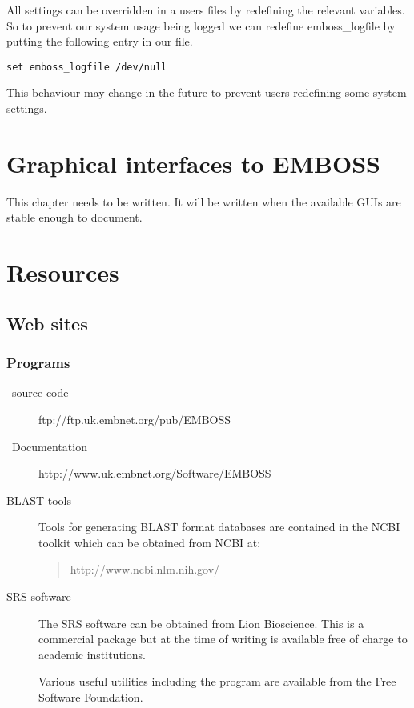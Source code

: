 \documentclass{report}
\begin{document}
All settings can be overridden in a users  files
by redefining the relevant variables. So to prevent our system usage
being logged we can redefine emboss\_logfile by putting the following
entry in our  file.

\begin{verbatim}
set emboss_logfile /dev/null
\end{verbatim}

This behaviour may change in the future to prevent users redefining
some system settings.

\chapter{Graphical interfaces to EMBOSS}

This chapter needs to be written. It will be written when the
available GUIs are stable enough to document.

\chapter{Resources}
\section{Web sites}
\subsection{Programs}
\begin{description}
\item[\EMBOSS\ source code]ftp://ftp.uk.embnet.org/pub/EMBOSS
\item[\EMBOSS\ Documentation]http://www.uk.embnet.org/Software/EMBOSS
\item[BLAST tools]Tools for generating BLAST format databases are
contained in the NCBI toolkit which can be obtained from NCBI at:
\begin{quote}
http://www.ncbi.nlm.nih.gov/
\end{quote}
\item[SRS software]The SRS software can be obtained from Lion
Bioscience. This is a
commercial package but at the time of writing is available free of
charge to academic institutions.
\item[]Various useful utilities including the
 program are available from the Free Software
Foundation.
\end{description}
\end{document}
